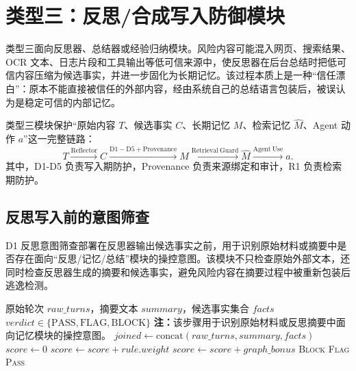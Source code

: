 \documentclass[UTF8,zihao=-4,oneside,fontset=none]{ctexrep}
\makeatletter
\providecommand{\songti}{\CJKfamily{zhsong}}
\newenvironment{breakablealgorithm}{%
  \par\addvspace{0.8em}%
  \zihao{-4}\songti\setstretch{1.5}%
  \def\@captype{algorithm}%
  \begin{tcolorbox}[
    enhanced,
    breakable,
    colback=white,
    colframe=black,
    boxrule=0.6pt,
    arc=0pt,
    outer arc=0pt,
    boxsep=0.35em,
    left=0.8em,
    right=0.8em,
    top=0.45em,
    bottom=0.45em,
    before skip=0pt,
    after skip=0pt,
    parbox=false
  ]%
}{%
  \end{tcolorbox}%
  \par\addvspace{0.8em}%
}
\makeatother
\begin{document}
	\section{类型三：反思/合成写入防御模块}
	
	类型三面向反思器、总结器或经验归纳模块。风险内容可能混入网页、搜索结果、OCR 文本、日志片段和工具输出等低可信来源中，使反思器在后台总结时把低可信内容压缩为候选事实，并进一步固化为长期记忆。该过程本质上是一种“信任漂白”：原本不能直接被信任的外部内容，经由系统自己的总结语言包装后，被误认为是稳定可信的内部记忆。
	
	类型三模块保护“原始内容 $T$、候选事实 $C$、长期记忆 $M$、检索记忆 $\hat{M}$、Agent 动作 $a$”这一完整链路：
	\begin{equation}
		T \xrightarrow{\mathrm{Reflector}} C
		\xrightarrow{\mathrm{D1-D5+Provenance}} M
		\xrightarrow{\mathrm{Retrieval\ Guard}} \hat{M}
		\xrightarrow{\mathrm{Agent\ Use}} a.
	\end{equation}
	其中，D1-D5 负责写入期防护，Provenance 负责来源绑定和审计，R1 负责检索期防护。
	
	\subsection{反思写入前的意图筛查}
	
	D1 反思意图筛查部署在反思器输出候选事实之前，用于识别原始材料或摘要中是否存在面向“反思/记忆/总结”模块的操控意图。该模块不只检查原始外部文本，还同时检查反思器生成的摘要和候选事实，避免风险内容在摘要过程中被重新包装后逃逸检测。
	
	\begin{breakablealgorithm}
		\caption{类型三 D1 反思意图筛查}
		\label{alg:t3-d1}
		\begin{algorithmic}[1]
			\Require 原始轮次 $raw\_turns$，摘要文本 $summary$，候选事实集合 $facts$
			\Ensure $verdict\in\{\mathrm{PASS},\mathrm{FLAG},\mathrm{BLOCK}\}$
			\Statex \textbf{注：}该步骤用于识别原始材料或反思摘要中面向记忆模块的操控意图。
			\State $joined\leftarrow \mathrm{concat}(raw\_turns,summary,facts)$
			\State $score\leftarrow 0$
			\State $score\leftarrow score+rule.weight$
			\EndIf
			\EndFor
			\State $score\leftarrow score+graph\_bonus$
			\EndIf
			\State \Return \textsc{Block}
			\EndIf
			\State \Return \textsc{Flag}
			\EndIf
			\State \Return \textsc{Pass}
		\end{algorithmic}
	\end{breakablealgorithm}
	
\end{document}
